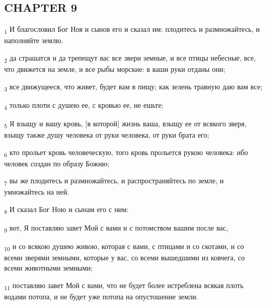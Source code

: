 \subsection{CHAPTER 9}
\begin{tcolorbox}
\textsubscript{1} И благословил Бог Ноя и сынов его и сказал им: плодитесь и размножайтесь, и наполняйте землю.
\end{tcolorbox}
\begin{tcolorbox}
\textsubscript{2} да страшатся и да трепещут вас все звери земные, и все птицы небесные, все, что движется на земле, и все рыбы морские: в ваши руки отданы они;
\end{tcolorbox}
\begin{tcolorbox}
\textsubscript{3} все движущееся, что живет, будет вам в пищу; как зелень травную даю вам все;
\end{tcolorbox}
\begin{tcolorbox}
\textsubscript{4} только плоти с душею ее, с кровью ее, не ешьте;
\end{tcolorbox}
\begin{tcolorbox}
\textsubscript{5} Я взыщу и вашу кровь, [в которой] жизнь ваша, взыщу ее от всякого зверя, взыщу также душу человека от руки человека, от руки брата его;
\end{tcolorbox}
\begin{tcolorbox}
\textsubscript{6} кто прольет кровь человеческую, того кровь прольется рукою человека: ибо человек создан по образу Божию;
\end{tcolorbox}
\begin{tcolorbox}
\textsubscript{7} вы же плодитесь и размножайтесь, и распространяйтесь по земле, и умножайтесь на ней.
\end{tcolorbox}
\begin{tcolorbox}
\textsubscript{8} И сказал Бог Ною и сынам его с ним:
\end{tcolorbox}
\begin{tcolorbox}
\textsubscript{9} вот, Я поставляю завет Мой с вами и с потомством вашим после вас,
\end{tcolorbox}
\begin{tcolorbox}
\textsubscript{10} и со всякою душею живою, которая с вами, с птицами и со скотами, и со всеми зверями земными, которые у вас, со всеми вышедшими из ковчега, со всеми животными земными;
\end{tcolorbox}
\begin{tcolorbox}
\textsubscript{11} поставляю завет Мой с вами, что не будет более истреблена всякая плоть водами потопа, и не будет уже потопа на опустошение земли.
\end{tcolorbox}
